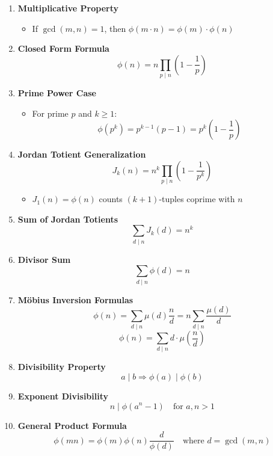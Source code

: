 \begin{enumerate}[leftmargin=*]
    \item \textbf{Multiplicative Property}
        \begin{itemize}
            \item If $\gcd(m, n) = 1$, then $\phi(m \cdot n) = \phi(m) \cdot \phi(n)$
        \end{itemize}
    
    \item \textbf{Closed Form Formula}
        \[\phi(n) = n\prod_{p \mid n}\left(1 - \frac{1}{p}\right)\]
    
    \item \textbf{Prime Power Case}
        \begin{itemize}
            \item For prime $p$ and $k \geq 1$:
            \[\phi(p^k) = p^{k-1}(p-1) = p^k\left(1 - \frac{1}{p}\right)\]
        \end{itemize}
    
    \item \textbf{Jordan Totient Generalization}
        \[J_k(n) = n^k\prod_{p \mid n}\left(1 - \frac{1}{p^k}\right)\]
        \begin{itemize}
            \item $J_1(n) = \phi(n)$ counts $(k+1)$-tuples coprime with $n$
        \end{itemize}
    
    \item \textbf{Sum of Jordan Totients}
        \[\sum_{d \mid n} J_k(d) = n^k\]
    
    \item \textbf{Divisor Sum}
        \[\sum_{d \mid n} \phi(d) = n\]
    
    \item \textbf{Möbius Inversion Formulas}
        \[\phi(n) = \sum_{d \mid n} \mu(d)\frac{n}{d} = n\sum_{d \mid n} \frac{\mu(d)}{d}\]
        \[\phi(n) = \sum_{d \mid n} d \cdot \mu\left(\frac{n}{d}\right)\]
    
    \item \textbf{Divisibility Property}
        \[a \mid b \Rightarrow \phi(a) \mid \phi(b)\]
    
    \item \textbf{Exponent Divisibility}
        \[n \mid \phi(a^n - 1) \quad \text{for } a, n > 1\]
    
    \item \textbf{General Product Formula}
        \[\phi(mn) = \phi(m)\phi(n)\frac{d}{\phi(d)} \quad \text{where } d = \gcd(m,n)\]
    

\end{enumerate}
